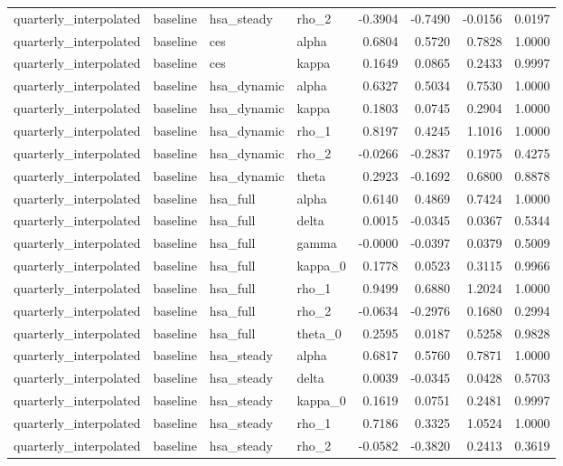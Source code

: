 \begin{tabular}{llllrrrr}
quarterly\_interpolated & baseline & hsa\_steady & rho\_2 & -0.3904 & -0.7490 & -0.0156 & 0.0197 \\
quarterly\_interpolated & baseline & ces & alpha & 0.6804 & 0.5720 & 0.7828 & 1.0000 \\
quarterly\_interpolated & baseline & ces & kappa & 0.1649 & 0.0865 & 0.2433 & 0.9997 \\
quarterly\_interpolated & baseline & hsa\_dynamic & alpha & 0.6327 & 0.5034 & 0.7530 & 1.0000 \\
quarterly\_interpolated & baseline & hsa\_dynamic & kappa & 0.1803 & 0.0745 & 0.2904 & 1.0000 \\
quarterly\_interpolated & baseline & hsa\_dynamic & rho\_1 & 0.8197 & 0.4245 & 1.1016 & 1.0000 \\
quarterly\_interpolated & baseline & hsa\_dynamic & rho\_2 & -0.0266 & -0.2837 & 0.1975 & 0.4275 \\
quarterly\_interpolated & baseline & hsa\_dynamic & theta & 0.2923 & -0.1692 & 0.6800 & 0.8878 \\
quarterly\_interpolated & baseline & hsa\_full & alpha & 0.6140 & 0.4869 & 0.7424 & 1.0000 \\
quarterly\_interpolated & baseline & hsa\_full & delta & 0.0015 & -0.0345 & 0.0367 & 0.5344 \\
quarterly\_interpolated & baseline & hsa\_full & gamma & -0.0000 & -0.0397 & 0.0379 & 0.5009 \\
quarterly\_interpolated & baseline & hsa\_full & kappa\_0 & 0.1778 & 0.0523 & 0.3115 & 0.9966 \\
quarterly\_interpolated & baseline & hsa\_full & rho\_1 & 0.9499 & 0.6880 & 1.2024 & 1.0000 \\
quarterly\_interpolated & baseline & hsa\_full & rho\_2 & -0.0634 & -0.2976 & 0.1680 & 0.2994 \\
quarterly\_interpolated & baseline & hsa\_full & theta\_0 & 0.2595 & 0.0187 & 0.5258 & 0.9828 \\
quarterly\_interpolated & baseline & hsa\_steady & alpha & 0.6817 & 0.5760 & 0.7871 & 1.0000 \\
quarterly\_interpolated & baseline & hsa\_steady & delta & 0.0039 & -0.0345 & 0.0428 & 0.5703 \\
quarterly\_interpolated & baseline & hsa\_steady & kappa\_0 & 0.1619 & 0.0751 & 0.2481 & 0.9997 \\
quarterly\_interpolated & baseline & hsa\_steady & rho\_1 & 0.7186 & 0.3325 & 1.0524 & 1.0000 \\
quarterly\_interpolated & baseline & hsa\_steady & rho\_2 & -0.0582 & -0.3820 & 0.2413 & 0.3619 \\

\end{tabular}
